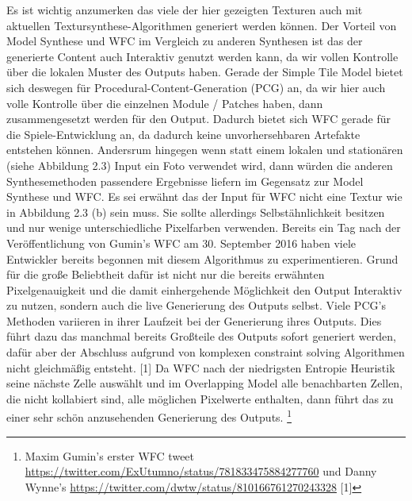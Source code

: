 \documentclass[12pt, a4paper,twoside,openright]{report}
\begin{document}
Es ist wichtig anzumerken das viele der hier gezeigten Texturen auch mit aktuellen Textursynthese-Algorithmen generiert werden können.
Der Vorteil von Model Synthese und WFC im Vergleich zu anderen Synthesen ist das der generierte Content auch Interaktiv genutzt werden kann,
da wir vollen Kontrolle über die lokalen Muster des Outputs haben.
Gerade der Simple Tile Model bietet sich deswegen für Procedural-Content-Generation {(PCG)} an, da wir hier auch volle Kontrolle über die einzelnen Module / Patches haben,
dann zusammengesetzt werden für den Output.
Dadurch bietet sich WFC gerade für die Spiele-Entwicklung an, da dadurch keine unvorhersehbaren Artefakte entstehen können.
Andersrum hingegen wenn statt einem lokalen und stationären {(siehe Abbildung 2.3)} Input ein Foto verwendet wird,
dann würden die anderen Synthesemethoden passendere Ergebnisse liefern im Gegensatz zur Model Synthese und WFC.
Es sei erwähnt das der Input für WFC nicht  eine Textur wie in Abbildung 2.3 {(b)} sein muss.
Sie sollte allerdings Selbstähnlichkeit besitzen und nur wenige unterschiedliche Pixelfarben verwenden.
\newline
Bereits ein Tag nach der Veröffentlichung von Gumin's WFC am 30. September 2016 haben viele Entwickler bereits begonnen mit diesem Algorithmus zu experimentieren.
Grund für die große Beliebtheit dafür ist nicht nur die bereits erwähnten Pixelgenauigkeit und die damit einhergehende Möglichkeit den Output Interaktiv zu nutzen,
sondern auch die live Generierung des Outputs selbst.
Viele PCG's Methoden variieren in ihrer Laufzeit bei der Generierung ihres Outputs.
Dies führt dazu das manchmal bereits Großteile des Outputs sofort generiert werden,
dafür aber der Abschluss aufgrund von komplexen constraint solving Algorithmen nicht gleichmäßig entsteht. {[1]}
Da WFC nach der niedrigsten Entropie Heuristik seine nächste Zelle auswählt und im Overlapping Model alle benachbarten Zellen, die nicht kollabiert sind,
alle möglichen Pixelwerte enthalten, dann führt das zu einer sehr schön anzusehenden Generierung des Outputs.
\footnote[3]{Maxim Gumin’s erster WFC tweet 
\newline
\url{https://twitter.com/ExUtumno/status/781833475884277760}
\newline
und Danny Wynne’s 
\newline
\url{https://twitter.com/dwtw/status/810166761270243328} [1]}
\end{document}
